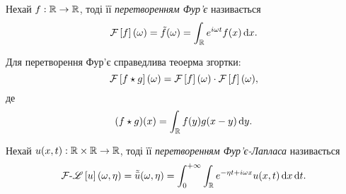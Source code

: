 \begin{definition}
    Нехай $f: \mathbb{R} \to \mathbb{R}$, тоді її \textit{перетворенням Фур'є} називається 
    \begin{equation}
        \mathcal{F}\left[f\right](\omega) = \tilde{f}(\omega) = \int_{\mathbb{R}} e^{i \omega t} f(x) \mathop{}\!\mathrm{d} x.
    \end{equation}
\end{definition}

\begin{proposition}
    Для перетворення Фур'є справедлива теоерма згортки:
    \begin{equation}
        \mathcal{F}\left[f \star g\right](\omega) = \mathcal{F}\left[f\right](\omega) \cdot \mathcal{F}\left[f\right](\omega),
    \end{equation}
    де
    \begin{equation}
        (f \star g)(x) = \int_{\mathbb{R}} f(y) g(x - y) \mathop{}\!\mathrm{d} y.
    \end{equation}
\end{proposition}

\begin{definition}
    Нехай $u(x, t): \mathbb{R} \times \mathbb{R} \to \mathbb{R}$, тоді її \textit{перетворенням Фур'є-Лапласа} називається 
    \begin{equation}
        \mathcal{F}\text{-}\mathscr{L}\left[u\right](\omega, \eta) = \tilde{\bar{u}}(\omega, \eta) = \int_0^{+\infty} \int_{\mathbb{R}} e^{-\eta t + i \omega x} u(x, t) \mathop{}\!\mathrm{d} x \mathop{}\!\mathrm{d} t.
    \end{equation}
\end{definition}

